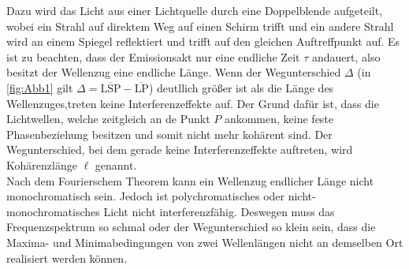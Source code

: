 Dazu wird das Licht aus einer Lichtquelle durch eine Doppelblende aufgeteilt, wobei ein Strahl auf direktem Weg auf einen Schirm trifft und
ein andere Strahl wird an einem Spiegel reflektiert und trifft auf den gleichen Auftreffpunkt auf.
Es ist zu beachten, dass der Emissionsakt nur eine endliche Zeit $\tau$ andauert, also besitzt der Wellenzug eine endliche Länge.
Wenn der Wegunterschied $\Delta$ (in \autoref{fig:Abb1} gilt $\Delta = \overline{\text{LSP}} - \overline{\text{LP}} $) deutllich größer ist 
als die Länge des Wellenzuges,treten keine Interferenzeffekte auf.
Der Grund dafür ist, dass die Lichtwellen, welche zeitgleich an de Punkt $P$ ankommen, keine feste Phasenbeziehung besitzen und somit nicht
mehr kohärent sind.
Der Wegunterschied, bei dem gerade keine Interferenzeffekte auftreten, wird Kohärenzlänge $\ell$ genannt.\\
Nach dem Fourierschem Theorem kann ein Wellenzug endlicher Länge nicht monochromatisch sein.
Jedoch ist polychromatisches oder nicht-monochromatisches Licht nicht interferenzfähig.
Deswegen muss das Frequenzspektrum so schmal oder der Wegunterschied so klein sein, dass die Maxima- und Minimabedingungen von zwei Wellenlängen
nicht an demselben Ort realisiert werden können.

